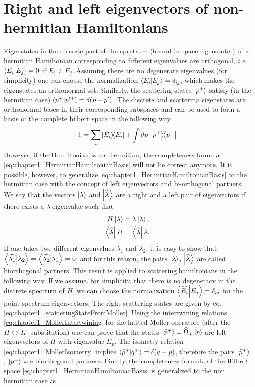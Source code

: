 \section{Right and left eigenvectors of non-hermitian Hamiltonians\label{sec:chapter1_LeftAndRightEigenstates}}

Eigenstates in the discrete part of the spectrum (bound-in-space eigenstates) of a hermitian Hamiltonian corresponding to different eigenvalues are orthogonal, \textit{i.e.} $\braket{E_i}{E_j} =0$ if $E_i\neq E_j$. Assuming there are no degenerate eigenvalues (for simplicity) one can choose the normalization $\braket{E_i}{E_j} =\delta_{ij}$, which makes the  eigenstates an orthonormal set. Similarly, the scattering states $\ket{p^+}$ satisfy (in the hermitian case) $\braket{p^+}{p'^+} =\delta(p-p')$. The discrete and scattering eigenstates are orthonormal bases in their corresponding subspaces and can be used to form a basis of the complete hilbert space in the following way
%
\begin{equation}
  1 = \sum_i \ketbra{E_i}{E_i} + \int dp\; \ketbra{p^+}{p^+}
  \label{eq:chapter1_HermitianHamiltonianBasis}
\end{equation}
%
However, if the Hamiltonian is not hermitian, the completeness formula \eqref{eq:chapter1_HermitianHamiltonianBasis} will not be correct anymore. It is possible, however, to generalize \eqref{eq:chapter1_HermitianHamiltonianBasis} to the hermitian case with the concept of left eigenvectors and bi-orthogonal partners. We say that the vectors $\ket{\lambda}$ and $\ket{\widehat{\lambda}}$ are a right and a left pair of eigenvectors if there exists a $\lambda$ eigenvalue such that
%
\begin{align}
  H \ket{\lambda} &= \lambda \ket{\lambda},\nonumber\\
  \bra{\widehat{\lambda}} H  &= \bra{\widehat{\lambda}}\lambda.
  \label{eq:chapter1_leftAndRightEigenvector}
\end{align}
%
If one takes two different eigenvalues $\lambda_1$ and $\lambda_2$, it is easy to show that $\braket{\widehat{\lambda_1}}{\lambda_2}=\braket{\widehat{\lambda_2}}{\lambda_1}=0$, and for this reason, the pairs $\ket{\lambda},\,\ket{\widehat{\lambda}}$ are called biorthogonal partners. This result is applied to scattering hamiltonians in the following way. If we assume, for simplicity, that there is no degeneracy in the discrete spectrum of $H$, we can choose the normalization $\braket{\widehat{E_i}}{E_j} = \delta_{ij}$ for the point spectrum eigenvectors. The right scattering states are given by eq. \eqref{eq:chapter1_scatteringStateFromMoller}. Using the intertwining relations \eqref{eq:chapter1_MollerIntertwining} for the hatted Moller operators (after the $H\leftrightarrow H^\dagger$ substitution) one can prove that the states $\ket{\widehat{p}^+} = \widehat{\Omega}_+\ket{p}$ are left eigenvectors of $H$ with eigenvalue $E_p$. The isometry relation \eqref{eq:chapter1_MollerIsometry} implies $\braket{\widehat{p}^+}{q^+} = \delta(q-p)$, therefore the pairs $\ket{\widehat{p}^+}$, $\ket{p^+}$ are biorthogonal partners. Finally, the completeness formula of the Hilbert space \eqref{eq:chapter1_HermitianHamiltonianBasis} is generalized to the non hermitian case as

